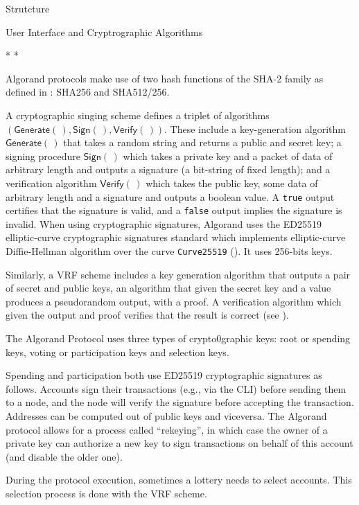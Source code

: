 \documentclass[10pt,a4paper]{article}
\begin{document}
\begin{section}{Strutcture}
\begin{subsection}{User Interface and Cryptrographic Algorithms}
    {\centering * * *\par}

    Algorand protocols make use of two hash functions of the SHA-2 family
    as defined in \cite{NIST.FIPS.180-4}: SHA256 and SHA512/256.
    
    A cryptographic singing scheme defines a triplet of algorithms $(\mathsf{Generate}(\,),\mathsf{Sign}(\,),\mathsf{Verify}(\,))$. 
    These include a key-generation algorithm $\mathsf{Generate}(\,)$ that takes a random string and
    returns a public and secret key; a signing procedure $\mathsf{Sign}(\,)$ which takes a private key 
    and a packet of data of arbitrary length and outputs a signature (a bit-string of fixed length); and
    a verification algorithm $\mathsf{Verify}(\,)$ which takes the public key, some data of arbitrary 
    length and a signature and outputs a boolean value.
    A {\tt true} output certifies that the signature is valid, and a {\tt false} output implies the 
    signature is invalid.
    When using cryptographic signatures, Algorand uses the ED25519 elliptic-curve cryptographic 
    signatures standard which implements elliptic-curve Diffie-Hellman algorithm over the curve 
    {\tt Curve25519} (\cite{Bernstein:2006}). It uses 256-bits keys. 

    Similarly, a VRF scheme includes a key generation algorithm that outputs a pair of secret and public keys, 
    an algorithm that given the secret key and a value produces a pseudorandom output, with a proof. 
    A verification algorithm which given the output and proof verifies that the result is correct (see 
    \cite{MicaliRabinVadhan:1999}).

    The Algorand Protocol uses three types of crypto0graphic keys: 
    root or spending keys,
    voting or participation keys and
    selection keys.

    Spending and participation both use ED25519 cryptographic signatures as follows. 
    Accounts sign their transactions (e.g., via the CLI) before sending them to a node, and 
    the node will verify the signature before accepting the transaction. 
    Addresses can be computed out of public keys and viceversa.
    The Algorand protocol allows for a process called ``rekeying'', in which case 
    the owner of a private key can authorize a new key to sign transactions on behalf of this account
    (and disable the older one).

    During the protocol execution, sometimes a lottery needs to select accounts. This selection process
    is done with the VRF scheme.


\end{subsection}
\end{section}
\end{document}
